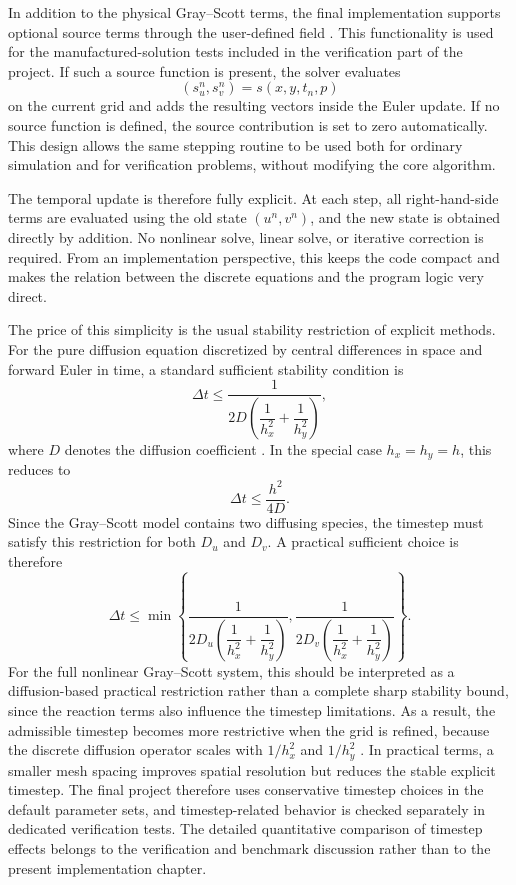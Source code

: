 In addition to the physical Gray--Scott terms, the final implementation supports optional source terms through the user-defined field . This functionality is used for the manufactured-solution tests included in the verification part of the project. If such a source function is present, the solver evaluates
\[
(s_u^n, s_v^n) = s(x,y,t_n,p)
\]
on the current grid and adds the resulting vectors inside the Euler update. If no source function is defined, the source contribution is set to zero automatically. This design allows the same stepping routine to be used both for ordinary simulation and for verification problems, without modifying the core algorithm.

The temporal update is therefore fully explicit. At each step, all right-hand-side terms are evaluated using the old state $(u^n,v^n)$, and the new state is obtained directly by addition. No nonlinear solve, linear solve, or iterative correction is required. From an implementation perspective, this keeps the code compact and makes the relation between the discrete equations and the program logic very direct.

The price of this simplicity is the usual stability restriction of explicit methods. For the pure diffusion equation discretized by central differences in space and forward Euler in time, a standard sufficient stability condition is
\begin{equation}
\Delta t \le
\frac{1}{2D\left(\dfrac{1}{h_x^2}+\dfrac{1}{h_y^2}\right)},
\label{eq:dt_stability_diffusion_numimpl}
\end{equation}
where $D$ denotes the diffusion coefficient \cite{leveque2007}. In the special case $h_x=h_y=h$, this reduces to
\begin{equation}
\Delta t \le \frac{h^2}{4D}.
\label{eq:dt_stability_diffusion_square_numimpl}
\end{equation}
Since the Gray--Scott model contains two diffusing species, the timestep must satisfy this restriction for both $D_u$ and $D_v$. A practical sufficient choice is therefore
\begin{equation}
\Delta t \le
\min\!\left\{
\frac{1}{2D_u\left(\dfrac{1}{h_x^2}+\dfrac{1}{h_y^2}\right)},
\frac{1}{2D_v\left(\dfrac{1}{h_x^2}+\dfrac{1}{h_y^2}\right)}
\right\}.
\label{eq:dt_stability_gray_scott_numimpl}
\end{equation}
For the full nonlinear Gray--Scott system, this should be interpreted as a diffusion-based practical restriction rather than a complete sharp stability bound, since the reaction terms also influence the timestep limitations. As a result, the admissible timestep becomes more restrictive when the grid is refined, because the discrete diffusion operator scales with $1/h_x^2$ and $1/h_y^2$ \cite{leveque2007}. In practical terms, a smaller mesh spacing improves spatial resolution but reduces the stable explicit timestep. The final project therefore uses conservative timestep choices in the default parameter sets, and timestep-related behavior is checked separately in dedicated verification tests. The detailed quantitative comparison of timestep effects belongs to the verification and benchmark discussion rather than to the present implementation chapter.

